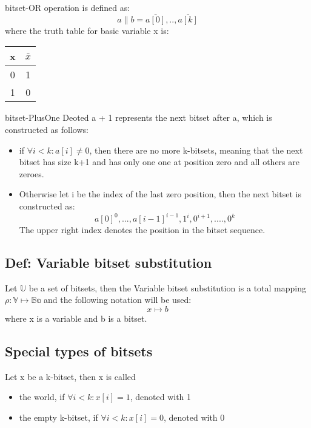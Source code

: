 \documentclass{article}
\begin{document}
			\newline
			bitset-OR operation is defined as:
			\begin{equation}
				a \| b = \bar{a[0]}, .. , \bar{a[k]}
			\end{equation}
			where the truth table for basic variable x is:
			\newline
			\begin{tabular}{c|c}
				x & $\bar{x}$ \\
				\hline
				0  & 1 \\
				1 & 0 \\
			\end{tabular} 
			\newline
			bitset-PlusOne
			Deoted a + 1 represents the next bitset after a, which is constructed as follows:
			\begin{itemize}
				\item if $\forall i < k: a[i] \neq 0$, then there are no more k-bitsets, meaning that
					the next bitset has size k+1 and has only one one at position zero and all others are zeroes.
				\item Otherwise let i be the index of the last zero position, then the next bitset is constructed as:
					\begin{equation}
						a[0]^0, ..., a[i-1]^{i-1}, 1^i, 0^{i+1}, ...., 0^k
					\end{equation}
					The upper right index denotes the position in the bitset sequence.
			\end{itemize}
		\subsection*{Def: Variable bitset substitution}
			Let $\mathbb{U}$ be a set of bitsets, then the Variable bitset substitution is a total mapping 
			 $\rho : \mathbb{V} \longmapsto \mathbb{Ba}$ and the following notation will be used:
			\begin{equation}
				x \longmapsto b
			\end{equation}
			where x is a variable and b is a bitset.
		\subsection*{Special types of bitsets}
			Let x be a k-bitset, then x is called
			\begin{itemize}
				\item the world, if $\forall i<k : x[i] = 1$, denoted with 1
				\item the empty k-bitset, if $\forall i<k : x[i] = 0$, denoted with 0
			\end{itemize}
\end{document}

